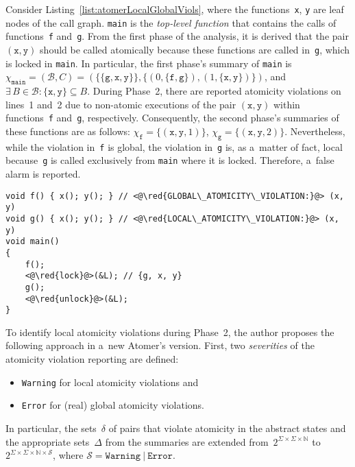 \begin{example}
    \label{ex:atomerLocalGlobalViols}
    Consider Listing~\ref{list:atomerLocalGlobalViols}, where the functions~\texttt{x}, \texttt{y} are leaf nodes of the call graph. \texttt{main} is the \emph{top-level function} that contains the calls of functions~\texttt{f} and~\texttt{g}. From the first phase of the analysis, it is derived that the pair $ (\mathtt{x}, \mathtt{y}) $ should be called atomically because these functions are called in~\texttt{g}, which is locked in \texttt{main}. In particular, the first phase's summary of \texttt{main} is $ \chi_\mathtt{main} = (\mathcal{B}, C) = (\{\{\mathtt{g}, \mathtt{x}, \mathtt{y}\}\}, \{(0, \{\mathtt{f}, \mathtt{g}\}), (1, \{\mathtt{x}, \mathtt{y}\})\}) $, and $ \exists\,B \in \mathcal{B} : \{\mathtt{x}, \mathtt{y}\} \subseteq B $. During Phase~2, there are reported atomicity violations on lines~1 and~2 due to non-atomic executions of the pair $ (\mathtt{x}, \mathtt{y}) $ within functions~\texttt{f} and~\texttt{g}, respectively. Consequently, the second phase's summaries of these functions are as follows: $ \chi_\mathtt{f} = \{(\mathtt{x}, \mathtt{y}, 1)\} $, $ \chi_\mathtt{g} = \{(\mathtt{x}, \mathtt{y}, 2)\} $. Nevertheless, while the violation in~\texttt{f} is global, the violation in~\texttt{g} is, as a~matter of fact, local because~\texttt{g} is called exclusively from \texttt{main} where it is locked. Therefore, a~false alarm is reported.
\end{example}

\begin{lstlisting}[style=c, label={list:atomerLocalGlobalViols}, float=hbt, caption={An example of so-called \emph{local} and \emph{global atomicity violations}}]
void f() { x(); y(); } // <@\red{GLOBAL\_ATOMICITY\_VIOLATION:}@> (x, y)
void g() { x(); y(); } // <@\red{LOCAL\_ATOMICITY\_VIOLATION:}@> (x, y)
void main()
{
    f();
    <@\red{lock}@>(&L); // {g, x, y}
    g();
    <@\red{unlock}@>(&L);
}
\end{lstlisting}

To identify local atomicity violations during Phase~2, the author proposes the following approach in a~new Atomer's version. First, two \emph{severities} of the atomicity violation reporting are defined:
\begin{itemize}
    \item \texttt{Warning} for local atomicity violations and

    \item \texttt{Error} for (real) global atomicity violations.
\end{itemize}
In particular, the sets~$ \delta $ of pairs that violate atomicity in the abstract states and the appropriate sets~$ \Delta $ from the summaries are extended from~$ 2^{\Sigma \times \Sigma \times \mathbb{N}} $ to~$ 2^{\Sigma \times \Sigma \times \mathbb{N} \times \mathcal{S}} $, where $ \mathcal{S} = \mathtt{Warning}\ |\ \mathtt{Error} $.

